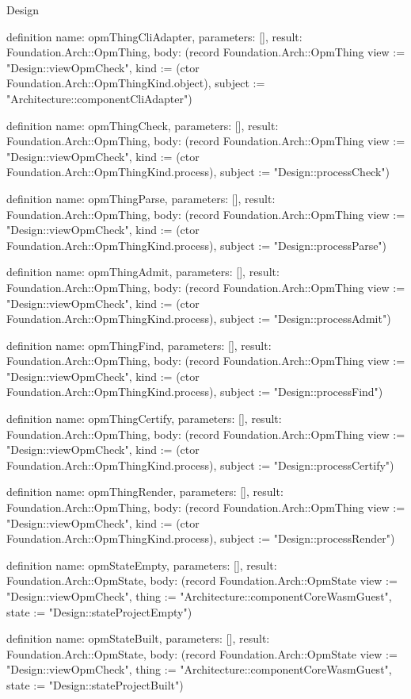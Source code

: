 \begin{lexlean}{Design}
\begin{semanticmodule}
definition{
  name: opmThingCliAdapter,
  parameters: [],
  result: Foundation.Arch::OpmThing,
  body: (record Foundation.Arch::OpmThing {view := "Design::viewOpmCheck", kind := (ctor Foundation.Arch::OpmThingKind.object), subject := "Architecture::componentCliAdapter"})
}

definition{
  name: opmThingCheck,
  parameters: [],
  result: Foundation.Arch::OpmThing,
  body: (record Foundation.Arch::OpmThing {view := "Design::viewOpmCheck", kind := (ctor Foundation.Arch::OpmThingKind.process), subject := "Design::processCheck"})
}

definition{
  name: opmThingParse,
  parameters: [],
  result: Foundation.Arch::OpmThing,
  body: (record Foundation.Arch::OpmThing {view := "Design::viewOpmCheck", kind := (ctor Foundation.Arch::OpmThingKind.process), subject := "Design::processParse"})
}

definition{
  name: opmThingAdmit,
  parameters: [],
  result: Foundation.Arch::OpmThing,
  body: (record Foundation.Arch::OpmThing {view := "Design::viewOpmCheck", kind := (ctor Foundation.Arch::OpmThingKind.process), subject := "Design::processAdmit"})
}

definition{
  name: opmThingFind,
  parameters: [],
  result: Foundation.Arch::OpmThing,
  body: (record Foundation.Arch::OpmThing {view := "Design::viewOpmCheck", kind := (ctor Foundation.Arch::OpmThingKind.process), subject := "Design::processFind"})
}

definition{
  name: opmThingCertify,
  parameters: [],
  result: Foundation.Arch::OpmThing,
  body: (record Foundation.Arch::OpmThing {view := "Design::viewOpmCheck", kind := (ctor Foundation.Arch::OpmThingKind.process), subject := "Design::processCertify"})
}

definition{
  name: opmThingRender,
  parameters: [],
  result: Foundation.Arch::OpmThing,
  body: (record Foundation.Arch::OpmThing {view := "Design::viewOpmCheck", kind := (ctor Foundation.Arch::OpmThingKind.process), subject := "Design::processRender"})
}

definition{
  name: opmStateEmpty,
  parameters: [],
  result: Foundation.Arch::OpmState,
  body: (record Foundation.Arch::OpmState {view := "Design::viewOpmCheck", thing := "Architecture::componentCoreWasmGuest", state := "Design::stateProjectEmpty"})
}

definition{
  name: opmStateBuilt,
  parameters: [],
  result: Foundation.Arch::OpmState,
  body: (record Foundation.Arch::OpmState {view := "Design::viewOpmCheck", thing := "Architecture::componentCoreWasmGuest", state := "Design::stateProjectBuilt"})
}


\end{semanticmodule}
\end{lexlean}
